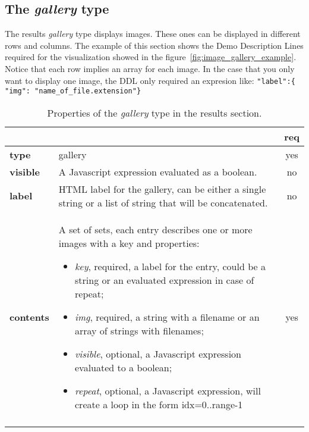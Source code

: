 \subsection{The \emph{gallery} type}

The results \emph{gallery} type displays images. These ones can be displayed in different rows and columns. The example of this section shows the Demo Description Lines required for the visualization showed in the figure~\ref{fig:image_gallery_example}. Notice that each row implies an array for each image. In the case that you only want to display one image, the DDL only required an expresion like:  \texttt{"label":\{ "img": "name\_of\_file.extension"\}}

\begin{longtable}{|>{\bf}L{\linewidth}|L{\linewidth}|c|}
\hline
      &  & {\bf req} 
\tabularnewline \hline \hline
 type       & gallery  & yes \\ \hline
 visible    & A Javascript expression evaluated as a boolean. & no \\ \hline
 label      & HTML label for the gallery, can be either a single string or 
             a list of string that will be concatenated. & no \\ \hline
 contents   & A set of sets, each entry describes one or more images with a key and properties:
\vspace{-1em}
\begin{itemize}
    \setlength\itemsep{-0.5em}
    \item \textit{key}, required, a label for the entry, could be a string or an evaluated expression in case of repeat;
    \item \textit{img}, required, a string with a filename or an array of strings with filenames;
    \item \textit{visible}, optional, a Javascript expression evaluated to a boolean;
    \item \textit{repeat}, optional, a Javascript expression, will create a loop in the form idx=0..range-1
\end{itemize} 
\vspace{-1em} & yes \\ \hline
\caption{Properties of the \emph{gallery} type in the results section.}
\end{longtable}

